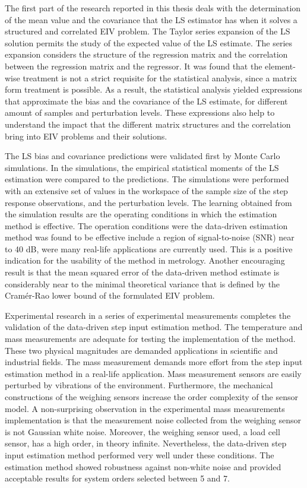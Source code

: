 The first part of the research reported in this thesis deals with the determination of the mean value and the covariance that the LS estimator has when it solves a structured and correlated EIV problem.
The Taylor series expansion of the LS solution permits the study of the expected value of the LS estimate.
The series expansion considers the structure of the regression matrix and the correlation between the regression matrix and the regressor.
It was found that the element-wise treatment is not a strict requisite for the statistical analysis, since a matrix form treatment is possible.
As a result, the statistical analysis yielded expressions that approximate the bias and the covariance of the LS estimate, for different amount of samples and perturbation levels.
These expressions also help to understand the impact that the different matrix structures and the correlation bring into EIV problems and their solutions.



The LS bias and covariance predictions were validated first by Monte Carlo simulations. 
In the simulations, the empirical statistical moments of the LS estimation were compared to the predictions.
The simulations were performed with an extensive set of values in the workspace of the sample size of the step response observations, and the perturbation levels.
The learning obtained from the simulation results are the operating conditions in which the estimation method is effective.
The operation conditions were the data-driven estimation method was found to be effective include a region of signal-to-noise (SNR) near to 40 dB, were many real-life applications are currently used.
This is a positive indication for the usability of the method in metrology.
Another encouraging result is that the mean squared error of the data-driven method estimate is considerably near to the minimal theoretical variance that is defined by the Cram\'er-Rao lower bound of the formulated EIV problem.




Experimental research in a series of experimental measurements completes the validation of the data-driven step input estimation method.
The temperature and mass measurements are adequate for testing the implementation of the method.
These two physical magnitudes are demanded applications in scientific and industrial fields.
The mass measurement demands more effort from the step input estimation method in a real-life application.
Mass measurement sensors are easily perturbed by vibrations of the environment.
Furthermore, the mechanical constructions of the weighing sensors increase the order complexity of the sensor model.
A non-surprising observation in the experimental mass measurements implementation is that the measurement noise collected from the weighing sensor is not Gaussian white noise.
Moreover, the weighing sensor used, a load cell sensor, has a high order, in theory infinite. 
Nevertheless, the data-driven step input estimation method performed very well under these conditions. 
The estimation method showed robustness against non-white noise and provided acceptable results for system orders selected between 5 and 7. 




